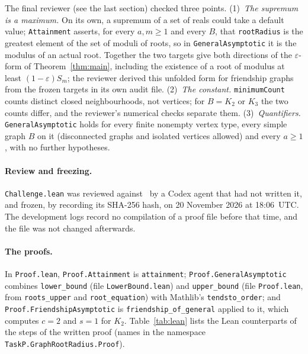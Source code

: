 \documentclass[11pt]{article}
\theoremstyle{definition}
\theoremstyle{remark}
\begin{document}
{The final reviewer (see the last section) checked three points.
(1)~\emph{The supremum is a maximum.} On its own, a supremum of a set of
reals could take a default value; \texttt{Attainment} asserts, for every
$a,m\ge1$ and every $B$, that \texttt{rootRadius} is the greatest element of
the set of moduli of roots, so in \texttt{GeneralAsymptotic} it is the
modulus of an actual root. Together the two targets give both directions of
the $\varepsilon$-form of Theorem~\ref{thm:main}, including the existence of
a root of modulus at least $(1-\varepsilon)S_m$; the reviewer derived this
unfolded form for friendship graphs from the frozen targets in its own audit
file. (2)~\emph{The constant.} \texttt{minimumCount} counts distinct closed
neighbourhoods, not vertices; for $B=K_2$ or $K_3$ the two counts differ, and
the reviewer's numerical checks separate them. (3)~\emph{Quantifiers.}
\texttt{GeneralAsymptotic} holds for every finite nonempty vertex type, every
simple graph $B$ on it (disconnected graphs and isolated vertices allowed)
and every $a\ge1$, with no further hypotheses.

\paragraph{Review and freezing.}
\texttt{Challenge.lean} was reviewed against~\cite{abj} by a Codex agent that
had not written it, and frozen, by recording its SHA-256 hash, on 20 November
2026 at 18:06~UTC. The development logs record no compilation of a proof file
before that time, and the file was not changed afterwards.

\paragraph{The proofs.}
In \texttt{Proof.lean}, \texttt{Proof.Attainment} is \texttt{attainment};
\texttt{Proof.GeneralAsymptotic} combines \texttt{lower\_\allowbreak bound}
(file \texttt{LowerBound.lean}) and \texttt{upper\_\allowbreak bound} (file
\texttt{Proof.lean}, from \texttt{roots\_\allowbreak upper} and
\texttt{root\_\allowbreak equation}) with Mathlib's
\texttt{tendsto\_\allowbreak order}; and \texttt{Proof.FriendshipAsymptotic}
is \texttt{friendship\_\allowbreak of\_\allowbreak general} applied to it,
which computes $c=2$ and $s=1$ for $K_2$. Table~\ref{tab:lean} lists the Lean
counterparts of the steps of the written proof (names in the namespace
\texttt{TaskP.GraphRootRadius.Proof}).

}
\end{document}
